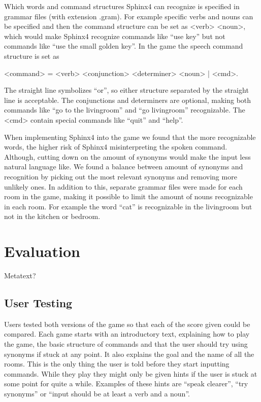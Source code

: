 Which words and command structures Sphinx4 can recognize is specified in grammar files (with extension .gram). For example specific verbs and nouns can be specified and then the command structure can be set as <verb> <noun>, which would make Sphinx4 recognize commands like ``use key'' but not commands like ``use the small golden key''. In the game the speech command structure is set as

<command> = <verb> <conjunction> <determiner> <noun> | <cmd>.

The straight line symbolizes ``or'', so either structure separated by the straight line is acceptable. The conjunctions and determiners are optional, making both commands like ``go to the livingroom'' and ``go livingroom'' recognizable. The <cmd> contain special commands like ``quit'' and ``help''.

When implementing Sphinx4 into the game we found that the more recognizable words, the higher risk of Sphinx4 misinterpreting the spoken command. Although, cutting down on the amount of synonyms would make the input less natural language like. We found a balance between amount of synonyms and recognition by picking out the most relevant synonyms and removing more unlikely ones. In addition to this, separate grammar files were made for each room in the game, making it possible to limit the amount of nouns recognizable in each room. For example the word ``cat'' is recognizable in the livingroom but not in the kitchen or bedroom.

\section{Evaluation}
Metatext?

\subsection{User Testing}
Users tested both versions of the game so that each of the score given could be compared. Each game starts with an introductory text, explaining how to play the game, the basic structure of commands and that the user should try using synonyms if stuck at any point. It also explains the goal and the name of all the rooms. This is the only thing the user is told before they start inputting commands. While they play they might only be given hints if the user is stuck at some point for quite a while. Examples of these hints are ``speak clearer'', ``try synonyms'' or ``input should be at least a verb and a noun''.

